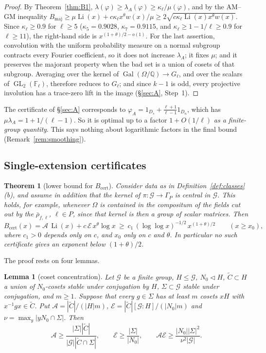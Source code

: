 \documentclass[11pt]{amsart}
\newtheorem{thmB}{Theorem}
\newtheorem{lemma}[theorem]{Lemma}
\theoremstyle{definition}
\theoremstyle{remark}
\newcommand{\Q}{\mathbb{Q}}
\newcommand{\F}{\mathbb{F}}
\DeclareMathOperator{\Gal}{Gal}
\DeclareMathOperator{\GL}{GL}
\DeclareMathOperator{\Li}{Li}
\newcommand{\cA}{\mathcal{A}}      %
\newcommand{\cE}{\mathcal{E}}      %
\newcommand{\cG}{\mathcal{G}}      %
\begin{document}
\begin{proof}
By Theorem~\ref{thm:B1}, $\lambda(\varphi)\ge\lambda_A(\varphi)\ge\kappa_\ell/\mu(\varphi)$, and by the AM--GM
inequality $B_{\mathrm{maj}}\ge\mu\Li(x)+c\kappa_\ell x^\theta w(x)/\mu\ge2\sqrt{c\kappa_\ell\Li(x)x^\theta w(x)}$.
Since $\kappa_\ell\ge0.9$ for $\ell\ge5$ ($\kappa_5=0.9028$, $\kappa_7=0.9115$, and $\kappa_\ell\ge1-1/\ell\ge0.9$
for $\ell\ge11$), the right-hand side is $x^{(1+\theta)/2-o(1)}$. For the last assertion, convolution with the uniform
probability measure on a normal subgroup contracts every Fourier coefficient, so it does not increase $\lambda_A$; it
fixes $\mu$; and it preserves the majorant property when the bad set is a union of cosets of that subgroup. Averaging
over the kernel of $\Gal(\Omega/\Q)\to G_\ell$, and over the scalars of $\GL_2(\F_\ell)$, therefore reduces to $G_\ell$; and since
$k-1$ is odd, every projective involution has a trace-zero lift in the image (\S\ref{sec:A}, Step~1).
\end{proof}

The certificate of \S\ref{sec:A} corresponds to $\varphi_A=1_{D_s}+\frac{\ell+1}{\ell-1}1_{D_n}$, which has
$\mu\lambda_A=1+1/(\ell-1)$. So it is optimal up to a factor $1+O(1/\ell)$ \emph{as a finite-group quantity}. This
says nothing about logarithmic factors in the final bound (Remark~\ref{rem:smoothing}).

\subsection{Single-extension certificates}

\begin{thmB}[lower bound for $B_{\mathrm{cert}}$]\label{thm:B3}
Consider data as in Definition~\ref{def:classes}(b), and assume in addition that the kernel of
$\pi:\cG\to\Gamma_P$ is central in $\cG$. This holds, for example, whenever $\Omega$ is contained in the compositum of
the fields cut out by the $\bar\rho_{f,\ell}$, $\ell\in P$, since that kernel is then a group of scalar matrices. Then
\[
  B_{\mathrm{cert}}(x)=\cA\,\Li(x)+c\,\cE\,x^\theta\log x\ \ge\ c_1\,(\log\log x)^{-1/2}\,x^{(1+\theta)/2}\qquad(x\ge x_0),
\]
where $c_1>0$ depends only on $c$, and $x_0$ only on $c$ and $\theta$. In particular no such certificate gives an exponent below $(1+\theta)/2$.
\end{thmB}

The proof rests on four lemmas.

\begin{lemma}[coset concentration]\label{lem:conc}
Let $\cG$ be a finite group, $H\le\cG$, $N_0\lhd H$, $\widetilde C\subset H$ a union of $N_0$-cosets stable under
conjugation by $H$, $\Sigma\subset\cG$ stable under conjugation, and $m\ge1$. Suppose that every $g\in\Sigma$ has at
least $m$ cosets $xH$ with $x^{-1}gx\in\widetilde C$. Put $\cA=|\widetilde C|/(|H|m)$,
$\cE=|\widetilde C|[\cG:H]/(|N_0|m)$ and $\nu=\max_y|yN_0\cap\Sigma|$. Then
\[
  \cA\ge\frac{|\Sigma||\widetilde C|}{|\cG||\widetilde C\cap\Sigma|},\qquad \cE\ge\frac{|\Sigma|}{|N_0|},\qquad \cA\cE\ge\frac{|N_0||\Sigma|^2}{\nu^2|\cG|}.
\]
\end{lemma}
\end{document}
